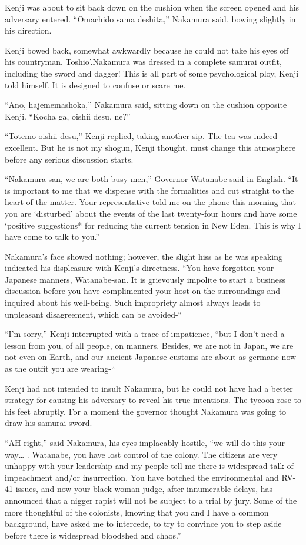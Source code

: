 \documentclass[]{article}
\begin{document}
{Kenji was about to sit back down on the cushion when the screen opened and his adversary entered.  “Omachido sama deshita,” Nakamura said, bowing slightly in his direction.

Kenji bowed back, somewhat awkwardly because he could not take his eyes off his countryman.  Toshio’.Nakamura was dressed in a complete samurai outfit, including the sword and dagger! This is all part of some psychological ploy, Kenji told himself.  It is designed to confuse or scare me.

“Ano, hajememashoka,” Nakamura said, sitting down on the cushion opposite Kenji.  “Kocha ga, oishii desu, ne?”

“Totemo oishii desu,” Kenji replied, taking another sip.  The tea was indeed excellent.  But he is not my shogun, Kenji thought.  must change this atmosphere before any serious discussion starts.

“Nakamura-san, we are both busy men,” Governor Watanabe said in English.  “It is important to me that we dispense with the formalities and cut straight to the heart of the matter.  Your representative told me on the phone this morning that you are ‘disturbed’ about the events of the last twenty-four hours and have some ‘positive suggestions* for reducing the current tension in New Eden.  This is why I have come to talk to you.”

Nakamura’s face showed nothing; however, the slight hiss as he was speaking indicated his displeasure with Kenji’s directness.  “You have forgotten your Japanese manners, Watanabe-san.  It is grievously impolite to start a business discussion before you have complimented your host on the surroundings and inquired about his well-being.  Such impropriety almost always leads to unpleasant disagreement, which can be avoided-“

“I’m sorry,” Kenji interrupted with a trace of impatience, “but I don’t need a lesson from you, of all people, on manners.  Besides, we are not in Japan, we are not even on Earth, and our ancient Japanese customs are about as germane now as the outfit you are wearing-“

Kenji had not intended to insult Nakamura, but he could not have had a better strategy for causing his adversary to reveal his true intentions.  The tycoon rose to his feet abruptly.  For a moment the governor thought Nakamura was going to draw his samurai sword.

“AH right,” said Nakamura, his eyes implacably hostile, “we will do this your way… .  Watanabe, you have lost control of the colony.  The citizens are very unhappy with your leadership and my people tell me there is widespread talk of impeachment and/or insurrection.  You have botched the environmental and RV-41 issues, and now your black woman judge, after innumerable delays, has announced that a nigger rapist will not be subject to a trial by jury.  Some of the more thoughtful of the colonists, knowing that you and I have a common background, have asked me to intercede, to try to convince you to step aside before there is widespread bloodshed and chaos.”

}
\end{document}
